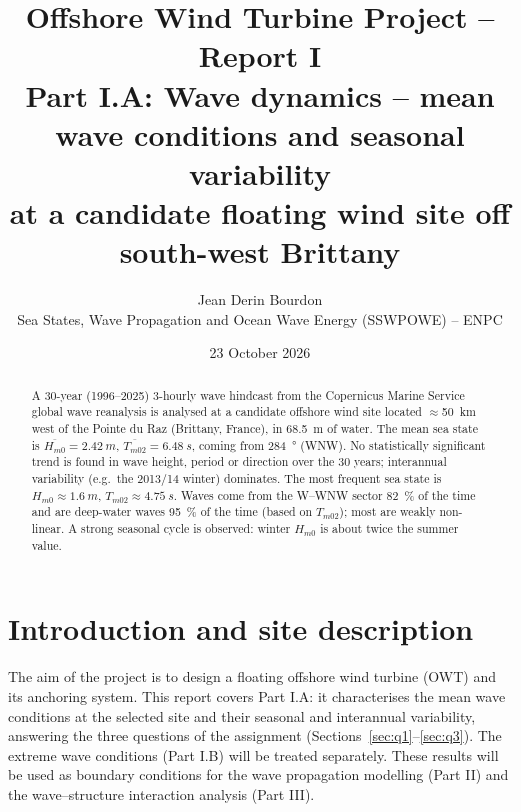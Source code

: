 \documentclass[11pt,a4paper]{article}
\title{\logo\textbf{Offshore Wind Turbine Project -- Report I}\\[4pt]
\large Part I.A: Wave dynamics -- mean wave conditions and seasonal variability\\
at a candidate floating wind site off south-west Brittany}
\author{Jean Derin Bourdon\\ \small Sea States, Wave Propagation and Ocean Wave Energy (SSWPOWE) -- ENPC}
\date{23 October 2026}
\newcommand{\Hs}{H_{m0}}
\newcommand{\Tm}{T_{m02}}
\begin{document}
\maketitle

\begin{abstract}
\noindent
A 30-year (1996--2025) 3-hourly wave hindcast from the Copernicus Marine Service global wave reanalysis is analysed at a candidate offshore wind site located $\approx$\SI{50}{km} west of the Pointe du Raz (Brittany, France), in \SI{68.5}{m} of water.
The mean sea state is $\overline{\Hs}=\SI{2.42}{m}$, $\overline{\Tm}=\SI{6.48}{s}$, coming from \SI{284}{\degree} (WNW).
No statistically significant trend is found in wave height, period or direction over the 30 years; interannual variability (e.g.\ the 2013/14 winter) dominates.
The most frequent sea state is $\Hs\approx\SI{1.6}{m}$, $\Tm\approx\SI{4.75}{s}$. Waves come from the W--WNW sector \SI{82}{\percent} of the time and are deep-water waves \SI{95}{\percent} of the time (based on $\Tm$); most are weakly non-linear.
A strong seasonal cycle is observed: winter $\Hs$ is about twice the summer value.
\end{abstract}


\section{Introduction and site description}

The aim of the project is to design a floating offshore wind turbine (OWT) and its anchoring system.
This report covers Part I.A: it characterises the mean wave conditions at the selected site and their seasonal and interannual variability, answering the three questions of the assignment (Sections~\ref{sec:q1}--\ref{sec:q3}). The extreme wave conditions (Part I.B) will be treated separately.
These results will be used as boundary conditions for the wave propagation modelling (Part II) and the wave--structure interaction analysis (Part III).
\end{document}
